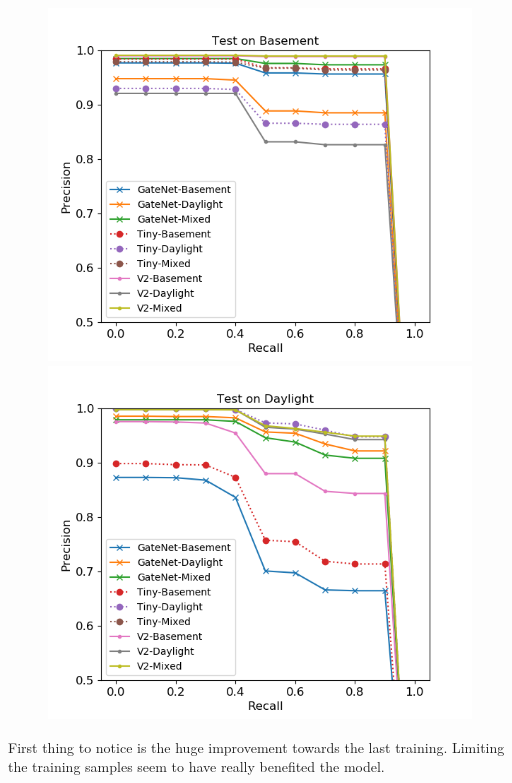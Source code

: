 \documentclass{article}
\begin{document}
\begin{figure}
	\centering
	\begin{minipage}{0.45\linewidth}
		\includegraphics[width=\linewidth]{fig/pr_basement_all}
	\end{minipage}
	\begin{minipage}{0.45\linewidth}
		\includegraphics[width=\linewidth]{fig/pr_daylight_all}
	\end{minipage}
\end{figure}

First thing to notice is the huge improvement towards the last training. Limiting the training samples seem to have really benefited the model.
\end{document}
